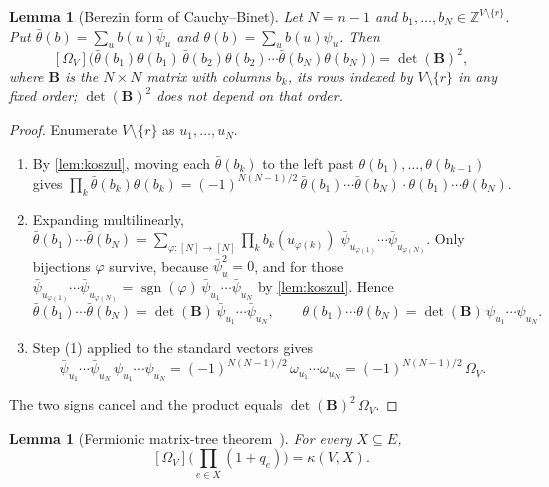 \documentclass[11pt]{amsart}
\theoremstyle{plain}
\newtheorem{lemma}[theorem]{Lemma}
\theoremstyle{definition}
\theoremstyle{remark}
\numberwithin{equation}{section}
\newcommand{\bpsi}{\bar\psi}
\newcommand{\Z}{\mathbb{Z}}
\newcommand{\topc}[2]{[#1]\bigl(#2\bigr)}
\begin{document}
\begin{lemma}[Berezin form of Cauchy--Binet]\label{lem:berezin-cb}
Let $N=n-1$ and $b_1,\dots,b_N\in\Z^{V\setminus\{r\}}$. Put $\bar\theta(b)=\sum_u b(u)\bpsi_u$ and
$\theta(b)=\sum_u b(u)\psi_u$. Then
\[
  \topc{\Omega_V}{\bar\theta(b_1)\theta(b_1)\,\bar\theta(b_2)\theta(b_2)\cdots\bar\theta(b_N)\theta(b_N)}=\det(\mathbf B)^2,
\]
where $\mathbf B$ is the $N\times N$ matrix with columns $b_k$, its rows indexed by
$V\setminus\{r\}$ in any fixed order; $\det(\mathbf B)^2$ does not depend on that order.
\end{lemma}

\begin{proof}
Enumerate $V\setminus\{r\}$ as $u_1,\dots,u_N$.
\begin{enumerate}[label=(\arabic*)]
\item By \cref{lem:koszul}, moving each $\bar\theta(b_k)$ to the left past
$\theta(b_1),\dots,\theta(b_{k-1})$ gives
$\prod_k\bar\theta(b_k)\theta(b_k)=(-1)^{N(N-1)/2}\,\bar\theta(b_1)\cdots\bar\theta(b_N)\cdot
\theta(b_1)\cdots\theta(b_N)$.
\item Expanding multilinearly,
$\bar\theta(b_1)\cdots\bar\theta(b_N)=\sum_{\varphi\colon[N]\to[N]}\prod_k b_k(u_{\varphi(k)})\;
\bpsi_{u_{\varphi(1)}}\cdots\bpsi_{u_{\varphi(N)}}$. Only bijections $\varphi$ survive, because
$\bpsi_u^2=0$, and for those $\bpsi_{u_{\varphi(1)}}\cdots\bpsi_{u_{\varphi(N)}}=\operatorname{sgn}
(\varphi)\,\bpsi_{u_1}\cdots\bpsi_{u_N}$ by \cref{lem:koszul}. Hence
\[
  \bar\theta(b_1)\cdots\bar\theta(b_N)=\det(\mathbf B)\,\bpsi_{u_1}\cdots\bpsi_{u_N},
  \qquad
  \theta(b_1)\cdots\theta(b_N)=\det(\mathbf B)\,\psi_{u_1}\cdots\psi_{u_N}.
\]
\item Step (1) applied to the standard vectors gives
\[
  \bpsi_{u_1}\cdots\bpsi_{u_N}\,\psi_{u_1}\cdots\psi_{u_N}=(-1)^{N(N-1)/2}\,\omega_{u_1}\cdots
  \omega_{u_N}=(-1)^{N(N-1)/2}\,\Omega_V .
\]
\end{enumerate}
The two signs cancel and the product equals $\det(\mathbf B)^2\,\Omega_V$.
\end{proof}

\begin{lemma}[Fermionic matrix-tree theorem~\cite{CJSSS04}]\label{lem:fermionic-mt}
For every $X\subseteq E$,
\[
  \topc{\Omega_V}{\prod_{e\in X}(1+q_e)}=\kappa(V,X).
\]
\end{lemma}
\end{document}
